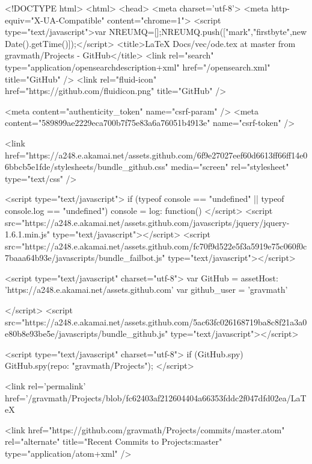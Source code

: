 
    

  

<!DOCTYPE html>
<html>
  <head>
    <meta charset='utf-8'>
    <meta http-equiv="X-UA-Compatible" content="chrome=1">
    <script type="text/javascript">var NREUMQ=[];NREUMQ.push(["mark","firstbyte",new Date().getTime()]);</script>
        <title>LaTeX Docs/vec/ode.tex at master from gravmath/Projects - GitHub</title>
    <link rel="search" type="application/opensearchdescription+xml" href="/opensearch.xml" title="GitHub" />
    <link rel="fluid-icon" href="https://github.com/fluidicon.png" title="GitHub" />

    
    

    <meta content="authenticity_token" name="csrf-param" />
<meta content="589899ae2229eca700b7f75e83a6a76051b4913e" name="csrf-token" />

    <link href="https://a248.e.akamai.net/assets.github.com/6f9e27027eef60d6613ff66ff14e06bbcb5e1fde/stylesheets/bundle_github.css" media="screen" rel="stylesheet" type="text/css" />
    

    <script type="text/javascript">
      if (typeof console == "undefined" || typeof console.log == "undefined")
        console = { log: function() {} }
    </script>
    <script src="https://a248.e.akamai.net/assets.github.com/javascripts/jquery/jquery-1.6.1.min.js" type="text/javascript"></script>
    <script src="https://a248.e.akamai.net/assets.github.com/fc70f9d522e5f3a5919e75c060f0c7baaa64b93e/javascripts/bundle_failbot.js" type="text/javascript"></script>


    <script type="text/javascript" charset="utf-8">
      var GitHub = {
        assetHost: 'https://a248.e.akamai.net/assets.github.com'
      }
      var github_user = 'gravmath'

      
    </script>
    <script src="https://a248.e.akamai.net/assets.github.com/5ac63fc026168719ba8c8f21a3a0e80b8e93be5e/javascripts/bundle_github.js" type="text/javascript"></script>


    
    <script type="text/javascript" charset="utf-8">
      if (GitHub.spy) {
        GitHub.spy({repo: "gravmath/Projects"});
      }
    </script>

    
  <link rel='permalink' href='/gravmath/Projects/blob/fc62403af212604404a66353fddc2f047dfd02ea/LaTeX%

  <link href="https://github.com/gravmath/Projects/commits/master.atom" rel="alternate" title="Recent Commits to Projects:master" type="application/atom+xml" />

